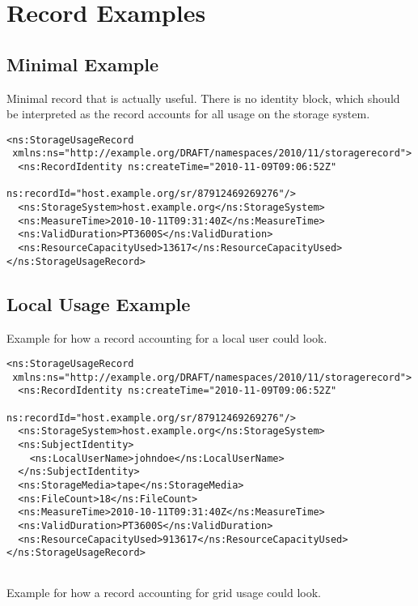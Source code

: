 
\section{Record Examples}
\label{sec:record-examples}


\subsection{Minimal Example}

Minimal record that is actually useful. There is no identity block, which should 
be interpreted as the record accounts for all usage on the storage
system.

\begin{verbatim}
<ns:StorageUsageRecord
 xmlns:ns="http://example.org/DRAFT/namespaces/2010/11/storagerecord">
  <ns:RecordIdentity ns:createTime="2010-11-09T09:06:52Z"
                     ns:recordId="host.example.org/sr/87912469269276"/>
  <ns:StorageSystem>host.example.org</ns:StorageSystem>
  <ns:MeasureTime>2010-10-11T09:31:40Z</ns:MeasureTime>
  <ns:ValidDuration>PT3600S</ns:ValidDuration>
  <ns:ResourceCapacityUsed>13617</ns:ResourceCapacityUsed>
</ns:StorageUsageRecord>
\end{verbatim}


\subsection{Local Usage Example}

Example for how a record accounting for a local user could look.

\begin{verbatim}
<ns:StorageUsageRecord
 xmlns:ns="http://example.org/DRAFT/namespaces/2010/11/storagerecord">
  <ns:RecordIdentity ns:createTime="2010-11-09T09:06:52Z"
                     ns:recordId="host.example.org/sr/87912469269276"/>
  <ns:StorageSystem>host.example.org</ns:StorageSystem>
  <ns:SubjectIdentity>
    <ns:LocalUserName>johndoe</ns:LocalUserName>
  </ns:SubjectIdentity>
  <ns:StorageMedia>tape</ns:StorageMedia>
  <ns:FileCount>18</ns:FileCount>
  <ns:MeasureTime>2010-10-11T09:31:40Z</ns:MeasureTime>
  <ns:ValidDuration>PT3600S</ns:ValidDuration>
  <ns:ResourceCapacityUsed>913617</ns:ResourceCapacityUsed>
</ns:StorageUsageRecord>


\end{verbatim}

Example for how a record accounting for grid usage could look.

